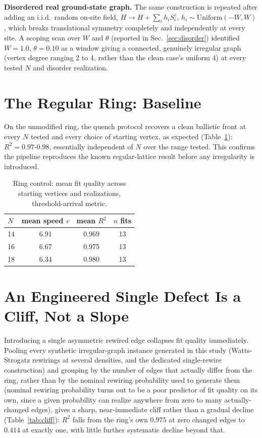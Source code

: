 \documentclass[11pt]{article}
\begin{document}
\textbf{Disordered real ground-state graph.} The same construction is repeated after adding an i.i.d.\ random on-site field, $H \to H + \sum_i h_i S^z_i$, $h_i\sim\mathrm{Uniform}(-W,W)$, which breaks translational symmetry completely and independently at every site. A scoping scan over $W$ and $\theta$ (reported in Sec.~\ref{sec:disorder}) identified $W=1.0$, $\theta=0.10$ as a window giving a connected, genuinely irregular graph (vertex degree ranging 2 to 4, rather than the clean case's uniform 4) at every tested $N$ and disorder realization.

\section{The Regular Ring: Baseline}
\label{sec:ring}

On the unmodified ring, the quench protocol recovers a clean ballistic front at every $N$ tested and every choice of starting vertex, as expected (Table~\ref{tab:ring}): $R^2=0.97$-$0.98$, essentially independent of $N$ over the range tested. This confirms the pipeline reproduces the known regular-lattice result before any irregularity is introduced.

\begin{table}[h]
\centering
\caption{Ring control: mean fit quality across starting vertices and realizations, threshold-arrival metric.}
\label{tab:ring}
\begin{tabular}{@{}lccc@{}}
\toprule
$N$ & mean speed $v$ & mean $R^2$ & $n$ fits \\
\midrule
14 & 6.91 & 0.969 & 13 \\
16 & 6.67 & 0.975 & 13 \\
18 & 6.34 & 0.980 & 13 \\
\bottomrule
\end{tabular}
\end{table}

\section{An Engineered Single Defect Is a Cliff, Not a Slope}
\label{sec:defect}

Introducing a single asymmetric rewired edge collapses fit quality immediately. Pooling every synthetic irregular-graph instance generated in this study (Watts-Strogatz rewirings at several densities, and the dedicated single-rewire construction) and grouping by the number of edges that actually differ from the ring, rather than by the nominal rewiring probability used to generate them (nominal rewiring probability turns out to be a poor predictor of fit quality on its own, since a given probability can realize anywhere from zero to many actually-changed edges), gives a sharp, near-immediate cliff rather than a gradual decline (Table~\ref{tab:cliff}): $R^2$ falls from the ring's own $0.975$ at zero changed edges to $0.414$ at exactly one, with little further systematic decline beyond that.
\end{document}
